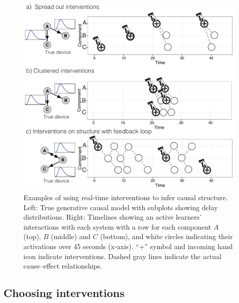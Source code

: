 \documentclass[10pt,letterpaper]{article}
\begin{document}
\begin{figure}[t]
   \centering
   \includegraphics[width = \columnwidth]{examples}
   \vspace{-0.6cm}
   \caption{Examples of using real-time interventions to infer causal structure. Left: True generative causal model with subplots showing delay distributions. Right: Timelines showing an active learners' interactions with each system with a row for each component $A$ (top), $B$ (middle) and $C$ (bottom), and white circles indicating their activations over 45 seconds (x-axis).  ``+'' symbol and incoming hand icon indicate interventions.  Dashed gray lines indicate the actual cause--effect relationships.}
   \vspace{-0.6cm}
   \label{fig:examples}
\end{figure}


\subsection{Choosing interventions}
\end{document}
